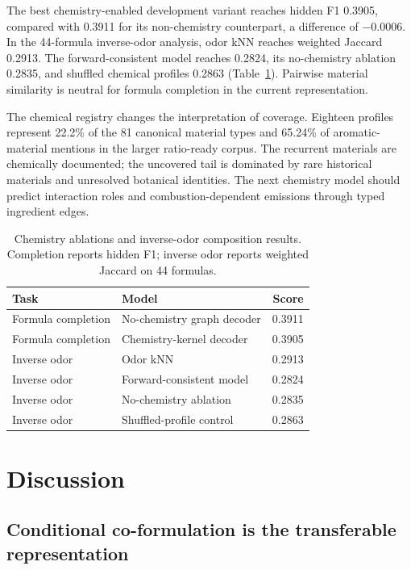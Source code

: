 \documentclass[11pt,a4paper]{article}
\begin{document}
The best chemistry-enabled development variant reaches hidden F1 0.3905, compared with 0.3911 for its non-chemistry counterpart, a difference of $-0.0006$. In the 44-formula inverse-odor analysis, odor kNN reaches weighted Jaccard 0.2913. The forward-consistent model reaches 0.2824, its no-chemistry ablation 0.2835, and shuffled chemical profiles 0.2863 (Table~\ref{tab:chemistry}). Pairwise material similarity is neutral for formula completion in the current representation.

The chemical registry changes the interpretation of coverage. Eighteen profiles represent 22.2\% of the 81 canonical material types and 65.24\% of aromatic-material mentions in the larger ratio-ready corpus. The recurrent materials are chemically documented; the uncovered tail is dominated by rare historical materials and unresolved botanical identities. The next chemistry model should predict interaction roles and combustion-dependent emissions through typed ingredient edges.

\begin{table}[t]
\centering
\caption{Chemistry ablations and inverse-odor composition results. Completion reports hidden F1; inverse odor reports weighted Jaccard on 44 formulas.}
\label{tab:chemistry}
\begin{tabular}{llr}
\toprule
Task & Model & Score \\
\midrule
Formula completion & No-chemistry graph decoder & 0.3911 \\
Formula completion & Chemistry-kernel decoder & 0.3905 \\
Inverse odor & Odor kNN & 0.2913 \\
Inverse odor & Forward-consistent model & 0.2824 \\
Inverse odor & No-chemistry ablation & 0.2835 \\
Inverse odor & Shuffled-profile control & 0.2863 \\
\bottomrule
\end{tabular}
\end{table}

\section{Discussion}

\subsection{Conditional co-formulation is the transferable representation}
\end{document}

